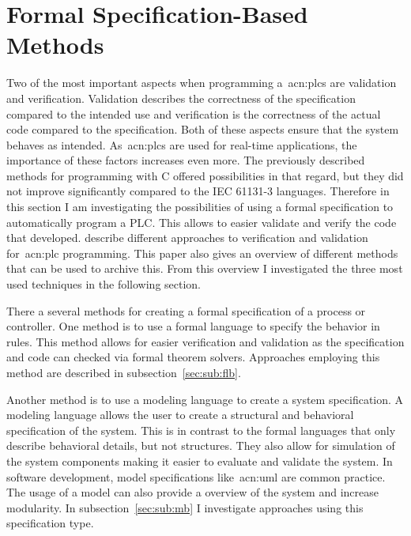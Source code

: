 \chapter{Formal Specification-Based Methods}
\label{sec:formal_methods}

Two of the most important aspects when programming a~\glspl{acn:plc} are validation and verification.
Validation describes the correctness of the specification compared to the intended use and verification is the correctness of the actual code compared to the specification.
Both of these aspects ensure that the system behaves as intended.
As~\glspl{acn:plc} are used for real-time applications, the importance of these factors increases even more.
The previously described methods for programming with C offered possibilities in that regard, but they did not improve significantly compared to the IEC 61131-3 languages.
Therefore in this section I am investigating the possibilities of using a formal specification to automatically program a PLC.
This allows to easier validate and verify the code that developed.
\citeauthor{Frey:2000aa} describe different approaches to verification and validation for~\acrshort{acn:plc} programming.
This paper also gives an overview of different methods that can be used to archive this.
From this overview I investigated the three most used techniques in the following section.

There a several methods for creating a formal specification of a process or controller.
One method is to use a formal language to specify the behavior in rules.
This method allows for easier verification and validation as the specification and code can checked via formal theorem solvers.
Approaches employing this method are described in subsection~\ref{sec:sub:flb}.

Another method is to use a modeling language to create a system specification.
A modeling language allows the user to create a structural and behavioral specification of the system.
This is in contrast to the formal languages that only describe behavioral details, but not structures.
They also allow for simulation of the system components making it easier to evaluate and validate the system.
In software development, model specifications like~\acrfull{acn:uml} are common practice.
The usage of a model can also provide a overview of the system and increase modularity.
In subsection~\ref{sec:sub:mb} I investigate approaches using this specification type.


